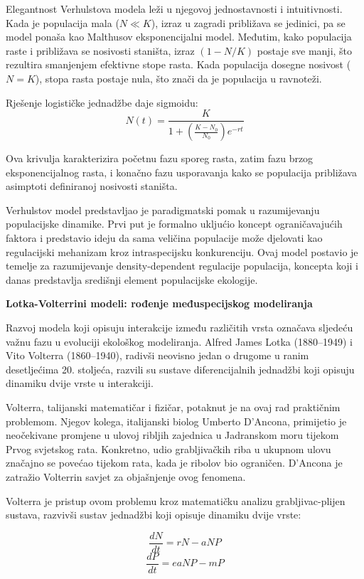 \documentclass[11pt,oneside]{book}
\begin{document}
Elegantnost Verhulstova modela leži u njegovoj jednostavnosti i intuitivnosti. Kada je populacija mala ($N \ll K$), izraz u zagradi približava se jedinici, pa se model ponaša kao Malthusov eksponencijalni model. Međutim, kako populacija raste i približava se nosivosti staništa, izraz $(1 - N/K)$ postaje sve manji, što rezultira smanjenjem efektivne stope rasta. Kada populacija dosegne nosivost ($N = K$), stopa rasta postaje nula, što znači da je populacija u ravnoteži.

Rješenje logističke jednadžbe daje sigmoidu:
$$N(t) = \frac{K}{1 + \left(\frac{K-N_0}{N_0}\right)e^{-rt}}$$

Ova krivulja karakterizira početnu fazu sporeg rasta, zatim fazu brzog eksponencijalnog rasta, i konačno fazu usporavanja kako se populacija približava asimptoti definiranoj nosivosti staništa.

Verhulstov model predstavljao je paradigmatski pomak u razumijevanju populacijske dinamike. Prvi put je formalno ukljućio koncept ograničavajućih faktora i predstavio ideju da sama veličina populacije može djelovati kao regulacijski mehanizam kroz intraspecijsku konkurenciju. Ovaj model postavio je temelje za razumijevanje density-dependent regulacije populacija, koncepta koji i danas predstavlja središnji element populacijske ekologije.

\textbf{Lotka-Volterrini modeli: rođenje međuspecijskog modeliranja}

Razvoj modela koji opisuju interakcije između različitih vrsta označava sljedeću važnu fazu u evoluciji ekološkog modeliranja. Alfred James Lotka (1880--1949) i Vito Volterra (1860--1940), radivši neovisno jedan o drugome u ranim desetljećima 20. stoljeća, razvili su sustave diferencijalnih jednadžbi koji opisuju dinamiku dvije vrste u interakciji.

Volterra, talijanski matematičar i fizičar, potaknut je na ovaj rad praktičnim problemom. Njegov kolega, italijanski biolog Umberto D'Ancona, primijetio je neočekivane promjene u ulovoj ribljih zajednica u Jadranskom moru tijekom Prvog svjetskog rata. Konkretno, udio grabljivačkih riba u ukupnom ulovu značajno se povećao tijekom rata, kada je ribolov bio ograničen. D'Ancona je zatražio Volterrin savjet za objašnjenje ovog fenomena.

Volterra je pristup ovom problemu kroz matematičku analizu grabljivac-plijen sustava, razvivši sustav jednadžbi koji opisuje dinamiku dvije vrste:

$$\frac{dN}{dt} = rN - aNP$$
$$\frac{dP}{dt} = eaNP - mP$$
\end{document}
